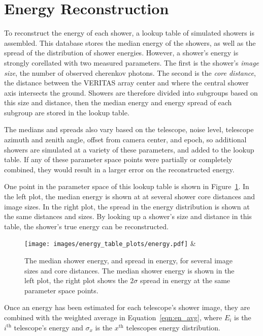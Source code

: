 \FloatBarrier

\section{Energy Reconstruction}\label{subsec:enrecon}

To reconstruct the energy of each shower, a lookup table of simulated showers is assembled.
This database stores the median energy of the showers, as well as the spread of the distribution of shower energies.
However, a shower's energy is strongly corellated with two measured parameters.
The first is the shower's \textit{image size}, the number of observed cherenkov photons.
The second is the \textit{core distance}, the distance between the VERITAS array center and where the central shower axis intersects the ground.
Showers are therefore divided into subgroups based on this size and distance, then the median energy and energy spread of each subgroup are stored in the lookup table.

The medians and spreads also vary based on the telescope, noise level, telescope azimuth and zenith angle, offset from camera center, and epoch, so additional showers are simulated at a variety of these parameters, and added to the lookup table.
If any of these parameter space points were partially or completely combined, they would result in a larger error on the reconstructed energy.

One point in the parameter space of this lookup table is shown in Figure~\ref{fig:energy_params}.
In the left plot, the median energy is shown at at several shower core distances and image sizes.
In the right plot, the spread in the energy distribution is shown at the same distances and sizes.
By looking up a shower's size and distance in this table, the shower's true energy can be reconstructed.

\begin{figure}[bh]
  \centering
  \texttt{[image: images/energy\_table\_plots/energy.pdf]} &
  \caption[Energy Table Parameters]{
    The median shower energy, and spread in energy, for several image sizes and core distances.
    The median shower energy is shown in the left plot, the right plot shows the $2\sigma$ spread in energy at the same parameter space points.
  }
  \label{fig:energy_params}
\end{figure}

Once an energy has been estimated for each telescope's shower image, they are combined with the weighted average in Equation~\ref{eqn:en_avg}, where $E_i$ is the $i^{\textrm{th}}$ telescope's energy and $\sigma_x$ is the $x^{\textrm{th}}$ telescopes energy distribution.

